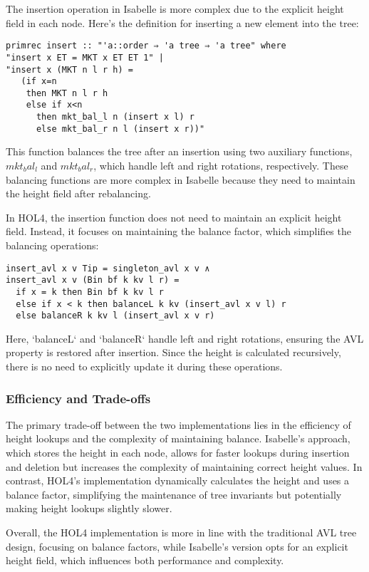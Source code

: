 \documentclass[12pt]{article}
\begin{document}
The insertion operation in Isabelle is more complex due to the explicit height field in each node. Here’s the definition for inserting a new element into the tree:

\begin{verbatim}
primrec insert :: "'a::order ⇒ 'a tree ⇒ 'a tree" where
"insert x ET = MKT x ET ET 1" |
"insert x (MKT n l r h) = 
   (if x=n
    then MKT n l r h
    else if x<n
      then mkt_bal_l n (insert x l) r
      else mkt_bal_r n l (insert x r))"
\end{verbatim}

This function balances the tree after an insertion using two auxiliary functions, \(mkt_bal_l\) and \(mkt_bal_r\), which handle left and right rotations, respectively. These balancing functions are more complex in Isabelle because they need to maintain the height field after rebalancing.

In HOL4, the insertion function does not need to maintain an explicit height field. Instead, it focuses on maintaining the balance factor, which simplifies the balancing operations:

\begin{verbatim}
insert_avl x v Tip = singleton_avl x v ∧  
insert_avl x v (Bin bf k kv l r) =
  if x = k then Bin bf k kv l r  
  else if x < k then balanceL k kv (insert_avl x v l) r  
  else balanceR k kv l (insert_avl x v r)
\end{verbatim}

Here, `balanceL` and `balanceR` handle left and right rotations, ensuring the AVL property is restored after insertion. Since the height is calculated recursively, there is no need to explicitly update it during these operations.

\subsubsection{Efficiency and Trade-offs}

The primary trade-off between the two implementations lies in the efficiency of height lookups and the complexity of maintaining balance. Isabelle's approach, which stores the height in each node, allows for faster lookups during insertion and deletion but increases the complexity of maintaining correct height values. In contrast, HOL4’s implementation dynamically calculates the height and uses a balance factor, simplifying the maintenance of tree invariants but potentially making height lookups slightly slower.

Overall, the HOL4 implementation is more in line with the traditional AVL tree design, focusing on balance factors, while Isabelle’s version opts for an explicit height field, which influences both performance and complexity.
\end{document}
